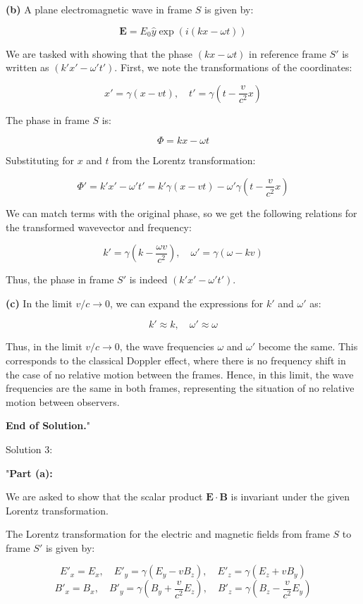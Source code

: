 \textbf{(b)} A plane electromagnetic wave in frame \( S \) is given by:

\[
\mathbf{E} = E_0 \hat{y} \exp \left( i (k x - \omega t) \right)
\]

We are tasked with showing that the phase \( (k x - \omega t) \) in reference frame \( S' \) is written as \( (k' x' - \omega' t') \). First, we note the transformations of the coordinates:

\[
x' = \gamma (x - v t), \quad t' = \gamma \left( t - \frac{v}{c^2} x \right)
\]

The phase in frame \( S \) is:

\[
\Phi = k x - \omega t
\]

Substituting for \( x \) and \( t \) from the Lorentz transformation:

\[
\Phi' = k' x' - \omega' t' = k' \gamma (x - v t) - \omega' \gamma \left( t - \frac{v}{c^2} x \right)
\]

We can match terms with the original phase, so we get the following relations for the transformed wavevector and frequency:

\[
k' = \gamma \left( k - \frac{\omega v}{c^2} \right), \quad \omega' = \gamma (\omega - k v)
\]

Thus, the phase in frame \( S' \) is indeed \( (k' x' - \omega' t') \).

\textbf{(c)} In the limit \( v / c \to 0 \), we can expand the expressions for \( k' \) and \( \omega' \) as:

\[
k' \approx k, \quad \omega' \approx \omega
\]

Thus, in the limit \( v / c \to 0 \), the wave frequencies \( \omega \) and \( \omega' \) become the same. This corresponds to the classical Doppler effect, where there is no frequency shift in the case of no relative motion between the frames. Hence, in this limit, the wave frequencies are the same in both frames, representing the situation of no relative motion between observers.

\textbf{End of Solution.}"

Solution 3:

"\textbf{Part (a):} 

We are asked to show that the scalar product \( \mathbf{E} \cdot \mathbf{B} \) is invariant under the given Lorentz transformation.

The Lorentz transformation for the electric and magnetic fields from frame \( S \) to frame \( S' \) is given by:

\[
E'_x = E_x, \quad E'_y = \gamma (E_y - v B_z), \quad E'_z = \gamma (E_z + v B_y)
\]
\[
B'_x = B_x, \quad B'_y = \gamma \left( B_y + \frac{v}{c^2} E_z \right), \quad B'_z = \gamma \left( B_z - \frac{v}{c^2} E_y \right)
\]

